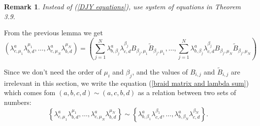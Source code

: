 \documentclass{article}
\newtheorem{remark}[lemma]{Remark}
\begin{document}



	


\begin{remark}
	Instead of (\ref{DJY equations}),
	\cite{DJY} use system of equations in Theorem 3.9.
\end{remark}

%
From the previous lemma
we get
\begin{equation}\label{braid matrix and lambda sum}
\left(\lambda_{c,\mu_1}^a\lambda_{b,d}^{\mu_1},\ldots,\lambda_{c,\mu_N}^a\lambda_{b,d}^{\mu_N}\right)
=\left(\sum_{j=1}^N\lambda_{b,\beta_j}^a\lambda_{c,d}^{\beta_j}B_{\beta_j,\mu_1}\tilde{B}_{\beta_j,\mu_1},\ldots,\sum_{j=1}^N\lambda_{b,\beta_j}^a\lambda_{c,d}^{\beta_j}B_{\beta_j,\mu_N}\tilde{B}_{\beta_j,\mu_N}\right)
\end{equation}



Since we don't need the order of $\mu_i$ and $\beta_j$,
and the values of $B_{i,j}$ and $\tilde{B}_{i,j}$ are irrelevant in this section,
we write the equation (\ref{braid matrix and lambda sum}) which comes fom $(a,b,c,d)\sim(a,c,b,d)$ 
as a relation between two sets of numbers:
\begin{equation}\label{lambda equation}
\left\{\lambda_{c,\mu_1}^a\lambda_{b,d}^{\mu_1},\ldots,\lambda_{c,\mu_N}^a\lambda_{b,d}^{\mu_N}\right\}
\sim\left\{\lambda_{b,\beta_1}^a\lambda_{c,d}^{\beta_1},\ldots,\lambda_{b,\beta_N}^a\lambda_{c,d}^{\beta_N}\right\}.
\end{equation}
\end{document}
